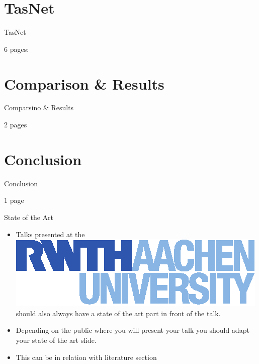 \documentclass[xcolor=table,mathserif,9pt]{beamer}    %
\begin{document}
\section{TasNet}%
\label{sec:tasnet}
\begin{frame}{TasNet}

6 pages:
\end{frame}

\section{Comparison \& Results}%
\label{sec:results}
\begin{frame}{Comparsino \& Results}

2 pages
\end{frame}

\section{Conclusion}%
\label{sec:conclusion}
\begin{frame}{Conclusion}

1 page
\end{frame}





\begin{frame}{State of the Art}
\begin{itemize}
\item Talks presented at the
  \href{http:://www-i6.rwth-aachen.de/}{\includegraphics[height=\baselineskip]{logos/logo_hltpr_rgb_RWTH.eps}}
  should also always have a state of the art part in front of the talk.
\item Depending on the public where you will present your talk you should
adapt your state of the art slide.
\item This can be in relation with literature section
\end{itemize}
\end{frame}
\end{document}
